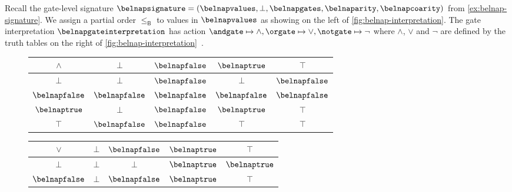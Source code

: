 \documentclass{lmcs}
\begin{document}
\begin{exa}\label{ex:belnap-interpretation}
    Recall the gate-level signature \(
    \belnapsignature = (
    \belnapvalues, \bot, \belnapgates, \belnaparity, \belnapcoarity
    )
    \) from \autoref{ex:belnap-signature}.
    We assign a partial order \(\leq_\mathsf{B}\) to values in
    \(\belnapvalues\) as showing on the left of
    \autoref{fig:belnap-interpretation}.
    The gate interpretation \(\belnapgateinterpretation\) has action \(
    \andgate \mapsto \land, \orgate \mapsto \lor, \notgate \mapsto \neg
    \) where \(\land\), \(\lor\) and \(\neg\) are defined by the truth tables
    on the right of \autoref{fig:belnap-interpretation}~\cite{belnap1977useful}.

    \begin{figure}
        \centering
        \qquad\qquad
        \begin{tabular}{|c|cccc|}
            \hline
            \(\land\)        & \(\bot\)         & \(\belnapfalse\) & \(\belnaptrue\)  & \(\top\)         \\
            \hline
            \(\bot\)         & \(\bot\)         & \(\belnapfalse\) & \(\bot\)         & \(\belnapfalse\) \\
            \(\belnapfalse\) & \(\belnapfalse\) & \(\belnapfalse\) & \(\belnapfalse\) & \(\belnapfalse\) \\
            \(\belnaptrue\)  & \(\bot\)         & \(\belnapfalse\) & \(\belnaptrue\)  & \(\top\)         \\
            \(\top\)         & \(\belnapfalse\) & \(\belnapfalse\) & \(\top\)         & \(\top\)         \\
            \hline
        \end{tabular}
        \quad
        \begin{tabular}{|c|cccc|}
            \hline
            \(\lor\)         & \(\bot\)        & \(\belnapfalse\) & \(\belnaptrue\) & \(\top\)        \\
            \hline
            \(\bot\)         & \(\bot\)        & \(\bot\)         & \(\belnaptrue\) & \(\belnaptrue\) \\
            \(\belnapfalse\) & \(\bot\)        & \(\belnapfalse\) & \(\belnaptrue\) & \(\top\)        \\

\end{tabular}
\end{figure}
\end{exa}
\end{document}
